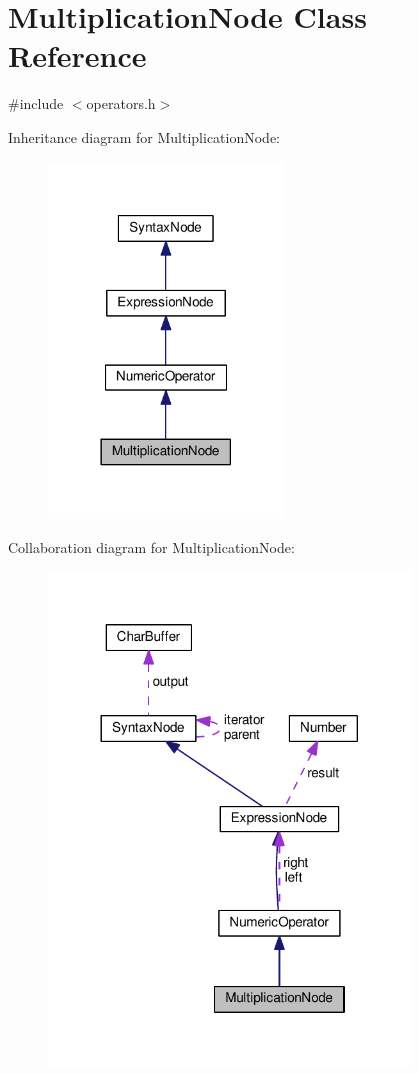 \hypertarget{classMultiplicationNode}{}\section{Multiplication\+Node Class Reference}
\label{classMultiplicationNode}


{\ttfamily \#include $<$operators.\+h$>$}



Inheritance diagram for Multiplication\+Node\+:\nopagebreak
\begin{figure}[H]
\begin{center}
\leavevmode
\includegraphics[width=177pt]{classMultiplicationNode__inherit__graph}
\end{center}
\end{figure}


Collaboration diagram for Multiplication\+Node\+:\nopagebreak
\begin{figure}[H]
\begin{center}
\leavevmode
\includegraphics[width=272pt]{classMultiplicationNode__coll__graph}
\end{center}
\end{figure}
